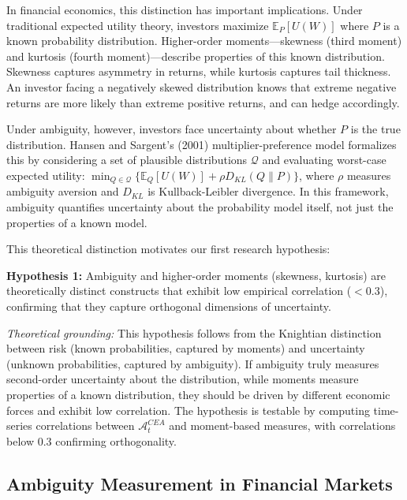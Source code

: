 \documentclass[preprint,12pt,authoryear]{elsarticle}
\begin{document}
In financial economics, this distinction has important implications. Under traditional expected utility theory, investors maximize $\mathbb{E}_P[U(W)]$ where $P$ is a known probability distribution. Higher-order moments—skewness (third moment) and kurtosis (fourth moment)—describe properties of this known distribution. Skewness captures asymmetry in returns, while kurtosis captures tail thickness. An investor facing a negatively skewed distribution knows that extreme negative returns are more likely than extreme positive returns, and can hedge accordingly.

Under ambiguity, however, investors face uncertainty about whether $P$ is the true distribution. Hansen and Sargent's (2001) multiplier-preference model formalizes this by considering a set of plausible distributions $\mathcal{Q}$ and evaluating worst-case expected utility: $\min_{Q \in \mathcal{Q}} \{\mathbb{E}_Q[U(W)] + \rho D_{KL}(Q\|P)\}$, where $\rho$ measures ambiguity aversion and $D_{KL}$ is Kullback-Leibler divergence. In this framework, ambiguity quantifies uncertainty about the probability model itself, not just the properties of a known model.

This theoretical distinction motivates our first research hypothesis:

\begin{center}
\textbf{Hypothesis 1:} Ambiguity and higher-order moments (skewness, kurtosis) are theoretically distinct constructs that exhibit low empirical correlation ($<0.3$), confirming that they capture orthogonal dimensions of uncertainty.
\end{center}

\noindent
\textit{Theoretical grounding:} This hypothesis follows from the Knightian distinction between risk (known probabilities, captured by moments) and uncertainty (unknown probabilities, captured by ambiguity). If ambiguity truly measures second-order uncertainty about the distribution, while moments measure properties of a known distribution, they should be driven by different economic forces and exhibit low correlation. The hypothesis is testable by computing time-series correlations between $\mathcal{A}^{CEA}_t$ and moment-based measures, with correlations below 0.3 confirming orthogonality.

\subsection{Ambiguity Measurement in Financial Markets}
\end{document}
